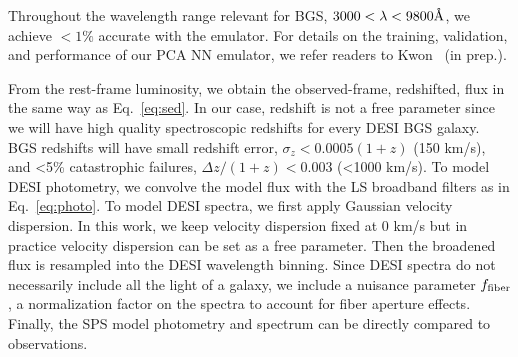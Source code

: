 

Throughout the wavelength range relevant for BGS, $3000 < \lambda < 9800\AA$,
we achieve $< 1\%$ accurate with the emulator. 
For details on the training, validation, and performance of our PCA NN
emulator, we refer readers to Kwon \etal~(in prep.). 

From the rest-frame luminosity, we obtain the observed-frame, redshifted, flux
in the same way as Eq.~\ref{eq:sed}.
In our case, redshift is not a free parameter since we will have high quality
spectroscopic redshifts for every DESI BGS galaxy.
BGS redshifts will have small redshift error, $\sigma_z < 0.0005 (1+z)$
(150 km/s), and <5\% catastrophic failures, $\Delta z/(1+z) < 0.003$ (<1000
km/s).
To model DESI photometry, we convolve the model flux with the LS broadband
filters as in Eq.~\ref{eq:photo}.
To model DESI spectra, we first apply Gaussian velocity dispersion. 
In this work, we keep velocity dispersion fixed at 0 km/s but in practice
velocity dispersion can be set as a free parameter. 
Then the broadened flux is resampled into the DESI wavelength binning. 
Since DESI spectra do not necessarily include all the light of a galaxy, we
include a nuisance parameter $f_{\rm fiber}$, a normalization factor on the
spectra to account for fiber aperture effects. 
Finally, the SPS model photometry and spectrum can be directly compared to
observations.

